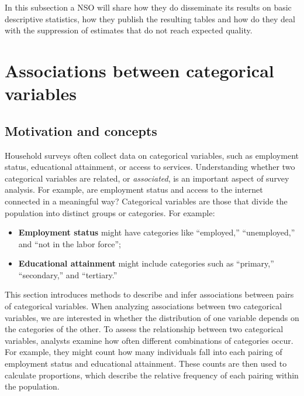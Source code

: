 \documentclass[
  12pt,
]{book}
\begin{document}
In this subsection a NSO will share how they do disseminate its results on basic descriptive statistics, how they publish the resulting tables and how do they deal with the suppression of estimates that do not reach expected quality.

\hypertarget{associations-between-categorical-variables}{%
\chapter{Associations between categorical variables}\label{associations-between-categorical-variables}}

\hypertarget{motivation-and-concepts}{%
\section{Motivation and concepts}\label{motivation-and-concepts}}

Household surveys often collect data on categorical variables, such as employment status, educational attainment, or access to services. Understanding whether two categorical variables are related, or \emph{associated}, is an important aspect of survey analysis. For example, are employment status and access to the internet connected in a meaningful way? Categorical variables are those that divide the population into distinct groups or categories. For example:

\begin{itemize}
\item
  \textbf{Employment status} might have categories like ``employed,'' ``unemployed,'' and ``not in the labor force'';
\item
  \textbf{Educational attainment} might include categories such as ``primary,'' ``secondary,'' and ``tertiary.''
\end{itemize}

This section introduces methods to describe and infer associations between pairs of categorical variables. When analyzing associations between two categorical variables, we are interested in whether the distribution of one variable depends on the categories of the other. To assess the relationship between two categorical variables, analysts examine how often different combinations of categories occur. For example, they might count how many individuals fall into each pairing of employment status and educational attainment. These counts are then used to calculate proportions, which describe the relative frequency of each pairing within the population.
\end{document}
